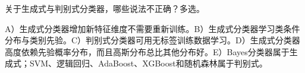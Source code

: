 关于生成式与判别式分类器，哪些说法不正确？多选。


A）生成式分类器增加新特征维度不需要重新训练。B）生成式分类器学习类条件分布与类别先验。C）判别式分类器可用无标签训练数据学习。D）生成式分类器高度依赖先验概率分布，而且高斯分布总比其他分布好。E）Bayes分类器属于生成式；SVM、逻辑回归、AdaBoost、XGBoost和随机森林属于判别式。
